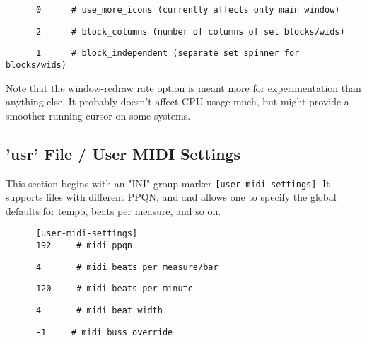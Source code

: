    \begin{verbatim}
      0      # use_more_icons (currently affects only main window)
   \end{verbatim}

   \begin{verbatim}
      2      # block_columns (number of columns of set blocks/wids)
   \end{verbatim}

   \begin{verbatim}
      1      # block_independent (separate set spinner for blocks/wids)
   \end{verbatim}

   Note that the window-redraw rate option is meant more for experimentation
   than anything else.  It probably doesn't affect CPU usage much, but might
   provide a smoother-running cursor on some systems.

\subsection{'usr' File / User MIDI Settings}
\label{subsec:usr_file_user_midi_settings}

   This section begins with an
   "INI" group marker \texttt{[user-midi-settings]}.
   It supports files with different PPQN, and and allows one to specify the
   global defaults for tempo, beats per measure, and so on.

   \begin{verbatim}
      [user-midi-settings]
      192     # midi_ppqn
   \end{verbatim}

   \begin{verbatim}
      4       # midi_beats_per_measure/bar
   \end{verbatim}

   \begin{verbatim}
      120     # midi_beats_per_minute
   \end{verbatim}

   \begin{verbatim}
      4       # midi_beat_width
   \end{verbatim}

   \begin{verbatim}
      -1     # midi_buss_override
   \end{verbatim}

